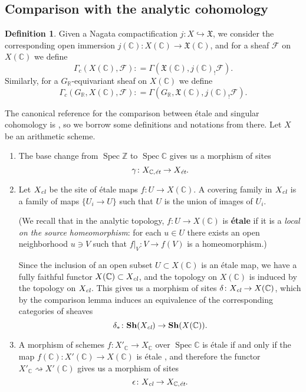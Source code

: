 \documentclass[leqno,12pt]{article}
\theoremstyle{plain}
\theoremstyle{definition}
\newtheorem{definition}[theorem]{\indent\sc Definition}
\DeclareMathOperator{\Spec}{Spec}
\newcommand{\CC}{\mathbb{C}}
\newcommand{\RR}{\mathbb{R}}
\newcommand{\ZZ}{\mathbb{Z}}
\newcommand{\dfn}{\mathrel{\mathop:}=}
\newcommand{\et}{\text{\it \'{e}t}}
\begin{document}
\subsection*{Comparison with the analytic cohomology}

\begin{definition}
  Given a Nagata compactification $j\colon X\hookrightarrow \mathfrak{X}$,
  we consider the corresponding open immersion
  $j (\CC)\colon X (\CC) \to \mathfrak{X} (\CC)$,
  and for a sheaf $\mathcal{F}$ on $X (\CC)$ we define
  \[ \Gamma_c (X (\CC), \mathcal{F}) \dfn
  \Gamma (\mathfrak{X} (\CC), j (\CC)_! \mathcal{F}). \]
  Similarly, for a $G_\RR$-equivariant sheaf on $X (\CC)$ we define
  \[ \Gamma_c (G_\RR, X (\CC), \mathcal{F}) \dfn
  \Gamma (G_\RR, \mathfrak{X} (\CC), j (\CC)_! \mathcal{F}). \]
\end{definition}

The canonical reference for the comparison between \'{e}tale and singular
cohomology is \cite[Expos\'{e}~XI, \S 4]{SGA4}, so we borrow some definitions
and notations from there. Let $X$ be an arithmetic scheme.

\begin{enumerate}
\item The base change from $\Spec \ZZ$ to $\Spec \CC$ gives us a morphism of
  sites
  $$\gamma\colon X_{\CC,\text{\it \'{e}t}} \to X_\et.$$

\item Let $X_\text{\it cl}$ be the site of \'{e}tale maps
  $f\colon U\to X (\CC)$. A covering family in $X_\text{\it cl}$ is a family of
  maps $\{ U_i \to U \}$ such that $U$ is the union of images of $U_i$.

  (We recall that in the analytic topology, $f\colon U\to X (\CC)$ is \textbf{\'{e}tale}
  if it is a \emph{local on the source homeomorphism}: for each $u \in U$ there
  exists an open neighborhood $u \ni V$ such that
  $\left.f\right|_V\colon V\to f(V)$ is a homeomorphism.)

  Since the inclusion of an open subset $U \subset X (\CC)$ is an \'{e}tale map,
  we have a fully faithful functor $X (\CC) \subset X_\text{\it cl}$, and the
  topology on $X (\CC)$ is induced by the topology on $X_\text{\it cl}$. This
  gives us a morphism of sites $\delta\colon X_\text{\it cl} \to X (\CC)$, which
  by the comparison lemma \cite[Expos\'{e}~III, Th\'{e}or\`{e}me~4.1]{SGA4}
  induces an equivalence of the corresponding categories of sheaves
  $$\delta_*\colon \mathbf{Sh} (X_\text{\it cl}) \to \mathbf{Sh} (X (\CC)).$$

\item A morphism of schemes $f\colon X'_\CC \to X_\CC$ over $\Spec \CC$ is
  \'{e}tale if and only if the map $f (\CC)\colon X' (\CC) \to X (\CC)$ is
  \'{e}tale \cite[Expos\'{e}~XII, Proposition~3.1]{SGA1}, and therefore the
  functor $X'_\CC \rightsquigarrow X' (\CC)$ gives us a morphism of sites
  $$\epsilon\colon X_\text{\it cl} \to X_{\CC,\text{\it \'{e}t}}.$$
\end{enumerate}
\end{document}
